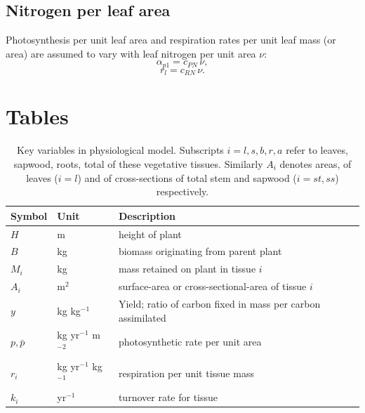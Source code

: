 \documentclass[10pt,twoside]{article}
\begin{document}
\subsection{Nitrogen per leaf area}

Photosynthesis per unit leaf area and respiration rates per unit leaf mass (or area)
are assumed to vary with leaf nitrogen per unit area $\nu$:
$$\alpha_{p1} = c_{PN} \, \nu,$$
$$r_l = c_{RN} \, \nu.$$

\clearpage

\section{Tables}\label{tables}

\begin{table}[h!]
 \caption{Key variables in physiological model.
 Subscripts $i = l, s, b, r, a$ refer to leaves, sapwood, roots, total of these vegetative tissues. Similarly $A_i$ denotes areas, of leaves ($i = l$) and of cross-sections of total stem and sapwood ($i = st, ss$) respectively.}
\centering
  \begin{tabular}{p{2cm}p{2cm}p{8cm}}
  \hline
  Symbol & Unit & Description \\
  \hline
  $H$   & m  & height of plant\\
  $B$   & kg  & biomass originating from parent plant\\
  $M_i$ & kg  & mass retained on plant in tissue $i$\\
  $A_i$ & m$^2$  & surface-area or cross-sectional-area of tissue $i$\\
  $y$ & kg kg$^{-1}$ & Yield; ratio of carbon fixed in mass per carbon assimilated \\
  $p,\bar{p}$ & kg yr$^{-1}$ m$^{-2}$  & photosynthetic rate per unit area \\
  $r_i$ & kg yr$^{-1}$ kg$^{-1}$  & respiration per unit tissue mass \\
  $k_i$ & yr$^{-1}$ & turnover rate for tissue \\
  \hline
  \end{tabular}
\label{tab:definitions}
\end{table}

\newpage
\end{document}
